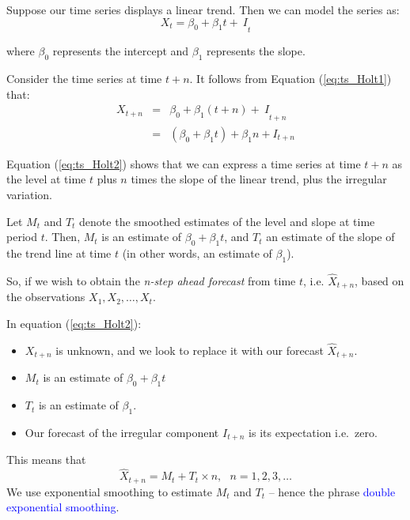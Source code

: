 \documentclass[12pt,a4paper,openany,twoside]{report}
\newcommand{\blue}{\textcolor{blue}}
\renewcommand{\emph}[1]{\textcolor{Emerald}{\textit{#1}}}
\newcommand{\emphx}[1]{\blue{#1}}
\theoremstyle{definition}
\theoremstyle{remark}
\theoremstyle{plain}
\theoremstyle{definition}
\theoremstyle{definition}
\theoremstyle{definition}
\theoremstyle{remark}
\begin{document}
Suppose our time series displays a linear trend. Then we can model the
series as:
\begin{equation}
X_{t} = \beta_{0} + {\beta_{1}t + \ I}_{t}
\label{eq:ts_Holt1}
\end{equation}

where \(\beta_{0}\) represents the intercept and \(\beta_{1}\)
represents the slope.

Consider the time series at time \(t + n\). It follows from Equation (\ref{eq:ts_Holt1}) that:
\begin{eqnarray}\nonumber
X_{t + n} & =& \beta_{0} + {\beta_{1}(t + n) + \ I}_{t + n}\\
          & = & \left( \beta_{0} + \beta_{1}t \right) + \beta_{1}n + I_{t + n}
\label{eq:ts_Holt2}
\end{eqnarray}

Equation (\ref{eq:ts_Holt2}) shows that we can express a time series at time
\(t + n\) as the level at time \(t\) plus \(n\) times the slope of the
linear trend, plus the irregular variation.

Let \(M_{t}\) and \(T_{t}\) denote the smoothed estimates of the level
and slope at time period \(t\). Then, \(M_{t}\) is an estimate
of \(\beta_{0} + \beta_{1}t\), and \(T_{t}\) an estimate of the slope of
the trend line at time \(t\) (in other words, an estimate of
\(\beta_{1}\)).

So, if we wish to obtain the \emph{n-step ahead forecast} from time \(t\),
i.e. \({\hat{X}}_{t + n}\), based on the observations
\(X_{1},X_{2},\ldots,X_{t}\).

In equation (\ref{eq:ts_Holt2}):

\begin{itemize}
\item
  \(X_{t + n}\) is unknown, and we look to replace it with our forecast
  \({\hat{X}}_{t + n}.\)
\item
  \(M_{t}\) is an estimate of \(\beta_{0} + \beta_{1}t\)
\item
  \(T_{t}\) is an estimate of \(\beta_{1}\).
\item
  Our forecast of the irregular component \(I_{t + n}\) is its
  expectation i.e.~zero.
\end{itemize}

This means that
\begin{equation}
{\hat{X}}_{t + n} = M_{t} + T_{t}\times n,\ \ \ n = 1,2,3,\ldots
\label{eq:ts_Holt3}
\end{equation}
We use exponential smoothing to estimate \(M_{t}\) and \(T_{t}\) --
hence the phrase \emphx{double exponential smoothing}.
\end{document}
